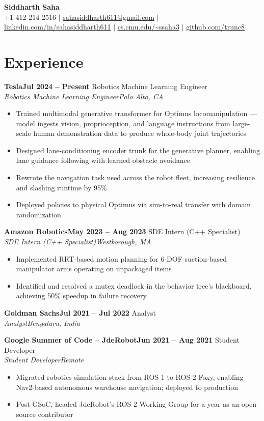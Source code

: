 \documentclass[letterpaper,10pt]{article}
\newcommand{\entry}[4]{%
  \vspace{3pt}%
  \noindent\textbf{#1}\hfill\textbf{#2}%
  \ifx\relax#3\relax\else\\%
    \noindent\textit{\small #3}\hfill\textit{\small #4}%
  \fi%
  \vspace{1pt}%
}
\newcommand{\resumeItemListStart}{\begin{itemize}[leftmargin=14pt, label=\textbullet, nosep, topsep=2pt, parsep=1pt]}
\newcommand{\resumeItemListEnd}{\end{itemize}}
\newcommand{\resumeItem}[1]{\item\small{#1}}
\begin{document}
\begin{center}
  {\LARGE\bfseries Siddharth Saha} \\[4pt]
  \small
  +1-412-214-2516 \enspace$\mid$\enspace
  \href{mailto:sahasiddharth611@gmail.com}{sahasiddharth611@gmail.com} \enspace$\mid$\enspace
  \href{https://linkedin.com/in/sahasiddharth611}{linkedin.com/in/sahasiddharth611} \enspace$\mid$\enspace
  \href{https://cs.cmu.edu/~ssaha3}{cs.cmu.edu/\textasciitilde ssaha3} \enspace$\mid$\enspace
  \href{https://github.com/trunc8}{github.com/trunc8}
\end{center}

\vspace{-8pt}

\section{Experience}

\entry{Tesla}{Jul 2024 -- Present}
  {Robotics Machine Learning Engineer}{Palo Alto, CA}
\resumeItemListStart
  \resumeItem{Trained multimodal generative transformer for Optimus locomanipulation --- model ingests vision, proprioception, and language instructions from large-scale human demonstration data to produce whole-body joint trajectories}
  \resumeItem{Designed lane-conditioning encoder trunk for the generative planner, enabling lane guidance following with learned obstacle avoidance}
  \resumeItem{Rewrote the navigation task used across the robot fleet, increasing resilience and slashing runtime by 95\%}
  \resumeItem{Deployed policies to physical Optimus via sim-to-real transfer with domain randomization}
\resumeItemListEnd

\entry{Amazon Robotics}{May 2023 -- Aug 2023}
  {SDE Intern (C{++} Specialist)}{Westborough, MA}
\resumeItemListStart
  \resumeItem{Implemented RRT-based motion planning for 6-DOF suction-based manipulator arms operating on unpackaged items}
  \resumeItem{Identified and resolved a mutex deadlock in the behavior tree's blackboard, achieving 50\% speedup in failure recovery}
\resumeItemListEnd

\entry{Goldman Sachs}{Jul 2021 -- Jul 2022}
  {Analyst}{Bengaluru, India}

\entry{Google Summer of Code -- JdeRobot}{Jun 2021 -- Aug 2021}
  {Student Developer}{Remote}
\resumeItemListStart
  \resumeItem{Migrated robotics simulation stack from ROS 1 to ROS 2 Foxy, enabling Nav2-based autonomous warehouse navigation; deployed to production}
  \resumeItem{Post-GSoC, headed JdeRobot's ROS 2 Working Group for a year as an open-source contributor}
\resumeItemListEnd
\end{document}
